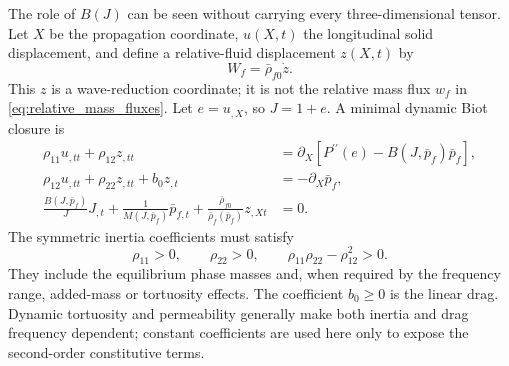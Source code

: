 \documentclass[11pt]{article}
\begin{document}
The role of \(B(J)\) can be seen without carrying every three-dimensional
tensor.  Let \(X\) be the propagation coordinate, \(u(X,t)\) the longitudinal
solid displacement, and define a relative-fluid displacement \(z(X,t)\) by
\begin{equation}
    W_f=\bar\rho_{f0}\dot z.
    \label{eq:relative_displacement_definition}
\end{equation}
This \(z\) is a wave-reduction coordinate; it is not the relative mass flux
\(w_f\) in \eqref{eq:relative_mass_fluxes}.  Let
\(e=u_{,X}\), so \(J=1+e\).  A minimal dynamic Biot closure is
\begin{subequations}
\label{eq:oned_parent}
\begin{align}
    \rho_{11}u_{,tt}+\rho_{12}z_{,tt}
    & =\partial_X\left[P^{\prime\prime}(e)-B(J,\bar p_f)\bar p_f\right],
    \label{eq:oned_total_momentum}\\
    \rho_{12}u_{,tt}+\rho_{22}z_{,tt}+b_0z_{,t}
    & =-\partial_X\bar p_f,
    \label{eq:oned_relative_momentum}\\
    \frac{B(J,\bar p_f)}{J}J_{,t}
    +\frac{1}{M(J,\bar p_f)}\bar p_{f,t}
    +\frac{\bar\rho_{f0}}{\bar\rho_f(\bar p_f)}z_{,Xt}
    & =0.
    \label{eq:oned_storage}
\end{align}
\end{subequations}
The symmetric inertia coefficients must satisfy
\begin{equation}
    \rho_{11}>0,
    \qquad
    \rho_{22}>0,
    \qquad
    \rho_{11}\rho_{22}-\rho_{12}^2>0.
    \label{eq:inertia_positivity}
\end{equation}
They include the equilibrium phase masses and, when required by the frequency
range, added-mass or tortuosity effects.
The coefficient \(b_0\geq0\) is the linear drag.  Dynamic tortuosity and
permeability generally make both inertia and drag frequency dependent; constant
coefficients are used here only to expose the second-order constitutive terms.
\end{document}

